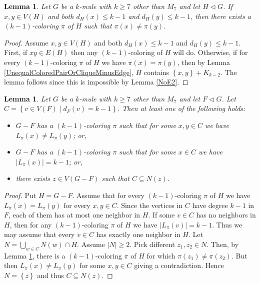 \documentclass[12pt]{article}
\theoremstyle{plain}
\newtheorem{lem}[thm]{Lemma}
\theoremstyle{definition}
\theoremstyle{remark}
\newcommand{\set}[1]{\left\{ #1 \right\}}
\newcommand{\setb}[3]{\left\{ #1 \in #2 \mid #3 \right\}}
\newcommand{\card}[1]{\left|#1\right|}
\begin{document}
\begin{lem}\label{UnequalColoredPair}
Let $G$ be a $k$-mule with $k \geq 7$ other than $M_7$ and let $H \lhd G$.  If $x, y \in V(H)$ and both $d_H(x) \leq k-1$ and $d_H(y) \leq k-1$, then there exists a $(k-1)$-coloring $\pi$ of $H$ such that $\pi(x) \neq \pi(y)$.
\end{lem}
\begin{proof}
Assume $x, y \in V(H)$ and both $d_H(x) \leq k-1$ and $d_H(y) \leq k-1$.  First, if $xy \in E(H)$ then any $(k-1)$-coloring of $H$ will do.  Otherwise, if for every $(k-1)$-coloring $\pi$ of $H$ we have $\pi(x) = \pi(y)$, then by Lemma \ref{UnequalColoredPairOrCliqueMinusEdge}, $H$ contains $\set{x, y} + K_{k-2}$.  The lemma follows since this is impossible by Lemma \ref{NoE2}.
\end{proof}

\begin{lem}\label{JoinerOrDifferentLists}
Let $G$ be a $k$-mule with $k \geq 7$ other than $M_7$ and let $F \lhd G$.  Let $C = \setb{v}{V(F)}{d_F(v) = k - 1}$.  Then at least one of the following holds:
\begin{itemize}
\item $G - F$ has a $(k-1)$-coloring $\pi$ such that for some $x, y \in C$ we have $L_{\pi}(x) \neq L_{\pi}(y)$; or,
\item $G - F$ has a $(k-1)$-coloring $\pi$ such that for some $x \in C$ we have $\card{L_{\pi}(x)} = k - 1$; or,
\item there exists $z \in V(G - F)$ such that $C \subseteq N(z)$.
\end{itemize}
\end{lem}
\begin{proof}
Put $H = G - F$.  Assume that for every $(k-1)$-coloring $\pi$ of $H$ we have $L_{\pi}(x) = L_{\pi}(y)$ for every $x, y \in C$.  Since the vertices in $C$ have degree $k-1$ in $F$, each of them has at most one neighbor in $H$.  If some $v \in C$ has no neighbors in $H$, then for any $(k-1)$-coloring $\pi$ of $H$ we have $\card{L_{\pi}(v)} = k - 1$.  Thus we may assume that every $v \in C$ has exactly one neighbor in $H$. Let $N = \bigcup_{w \in C} N(w) \cap H$. Assume $\card{N} \geq 2$. Pick different $z_1, z_2 \in N$. Then, by Lemma \ref{UnequalColoredPair}, there is a $(k-1)$-coloring $\pi$ of $H$ for which $\pi(z_1) \neq \pi(z_2)$.  But then $L_{\pi}(x) \neq L_{\pi}(y)$ for some $x, y \in C$ giving a contradiction.  Hence $N = \set{z}$ and thus $C \subseteq N(z)$.
\end{proof}
\end{document}

